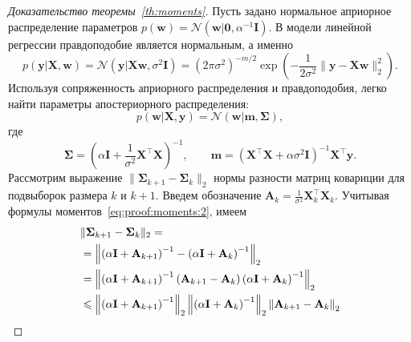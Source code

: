 \begin{proof}[Доказательство теоремы~\ref{th:moments}]
    Пусть задано нормальное априорное распределение параметров $p(\mathbf{w}) = \mathcal{N}\left( \mathbf{w} | \mathbf{0}, \alpha^{-1} \mathbf{I} \right)$. В модели линейной регрессии правдоподобие является нормальным, а именно
    \begin{equation}
        p(\mathbf{y} | \mathbf{X}, \mathbf{w}) = \mathcal{N}\left( \mathbf{y} | \mathbf{X} \mathbf{w}, \sigma^2 \mathbf{I} \right) = \left( 2\pi\sigma^2 \right)^{-m/2} \exp\left( -\frac{1}{2\sigma^2} \| \mathbf{y} - \mathbf{X} \mathbf{w} \|_2^2 \right). \label{eq:proof:moments:1}
    \end{equation}
    Используя сопряженность априорного распределения и правдоподобия, легко найти параметры апостериорного распределения:
    \begin{equation}
        p(\mathbf{w} | \mathbf{X}, \mathbf{y}) = \mathcal{N}\left( \mathbf{w} | \mathbf{m}, \boldsymbol{\Sigma} \right),
    \end{equation}
    где
    \begin{equation}
        \boldsymbol{\Sigma} = \left( \alpha \mathbf{I} + \frac{1}{\sigma^2} \mathbf{X}^\top \mathbf{X} \right)^{-1}, \qquad \mathbf{m} = \left( \mathbf{X}^\top \mathbf{X} + \alpha \sigma^2 \mathbf{I} \right)^{-1} \mathbf{X}^\top \mathbf{y}.
        \label{eq:proof:moments:2}
    \end{equation}
    Рассмотрим выражение $\| \boldsymbol{\Sigma}_{k+1} - \boldsymbol{\Sigma}_k \|_2$ нормы разности матриц ковариции для подвыборок размера $k$ и $k+1$. Введем обозначение $\mathbf{A}_k = \frac{1}{\sigma^2} \mathbf{X}^\top_k \mathbf{X}_k$. Учитывая формулы моментов~\eqref{eq:proof:moments:2}, имеем
    \begin{align}
        &\| \boldsymbol{\Sigma}_{k+1} - \boldsymbol{\Sigma}_k \|_2 = \notag \\
        &= \left\| \left( \alpha \mathbf{I} + \mathbf{A}_{k+1} \right)^{-1} - \left( \alpha \mathbf{I} + \mathbf{A}_k \right)^{-1} \right\|_2 \notag \\
        &= \left\| \left( \alpha \mathbf{I} + \mathbf{A}_{k+1} \right)^{-1} \left( \mathbf{A}_{k+1} - \mathbf{A}_k \right) \left( \alpha \mathbf{I} + \mathbf{A}_k \right)^{-1} \right\|_2 \notag \\
        &\leqslant \left\| \left( \alpha \mathbf{I} + \mathbf{A}_{k+1} \right)^{-1} \right\|_2 \left\| \left( \alpha \mathbf{I} + \mathbf{A}_k \right)^{-1} \right\|_2 \left\| \mathbf{A}_{k+1} - \mathbf{A}_k \right\|_2 \label{eq:proof:moments:3} \\

\end{align}
\end{proof}
